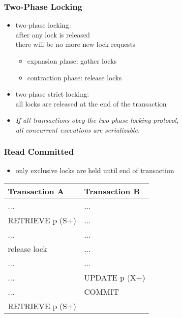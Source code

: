\documentclass[dvipsnames]{beamer}
\theoremstyle{plain}
\begin{document}
\begin{frame}
  \frametitle{Two-Phase Locking}

  \begin{itemize}
    \item \alert{two-phase locking}:\\
      after any lock is released\\
      there will be no more new lock requests
    \begin{itemize}
      \item expansion phase: gather locks
      \item contraction phase: release locks
    \end{itemize}

    \pause
    \item \alert{two-phase strict locking}:\\
      all locks are released at the end of the transaction

    \pause
    \medskip
    \item \emph{If all transactions obey the two-phase locking protocol,\\
      all concurrent executions are serializable.}
  \end{itemize}
\end{frame}

\begin{frame}[fragile]
  \frametitle{Read Committed}

  \begin{itemize}
    \item only exclusive locks are held until end of transaction
  \end{itemize}

  \begin{example}
    \begin{table}
      \begin{tabular}{ll}
Transaction A   & Transaction B\\\hline
...             & ...          \\\pause
RETRIEVE p (S+) & ...          \\\pause
...             & ...          \\
release lock    & ...          \\\pause
...             & ...          \\
...             & UPDATE p (X+)\\
...             & COMMIT       \\\pause
RETRIEVE p (S+) &
      \end{tabular}
    \end{table}
  \end{example}
\end{frame}
\end{document}

